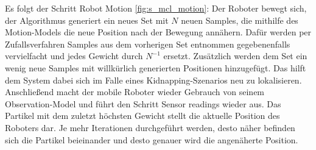 Es folgt der Schritt Robot Motion \ref{fig:s_mcl_motion}: Der Roboter bewegt sich, der Algorithmus generiert ein neues Set mit $N$ neuen Samples, die mithilfe des Motion-Models die neue Position nach der Bewegung annähern. Dafür werden per Zufallsverfahren Samples aus dem vorherigen Set entnommen gegebenenfalls vervielfacht und jedes Gewicht durch $N^{-1}$ ersetzt. Zusätzlich werden dem Set ein wenig neue Samples mit willkürlich generierten Positionen hinzugefügt. Das hilft dem System dabei sich im Falle eines Kidnapping-Szenarios neu zu lokalisieren. Anschließend macht der mobile Roboter wieder Gebrauch von seinem Observation-Model und führt den Schritt Sensor readings wieder aus. Das Partikel mit dem zuletzt höchsten Gewicht stellt die aktuelle Position des Roboters dar. Je mehr Iterationen durchgeführt werden, desto näher befinden sich die Partikel beieinander und desto genauer wird die angenäherte Position.
\mbox{}
